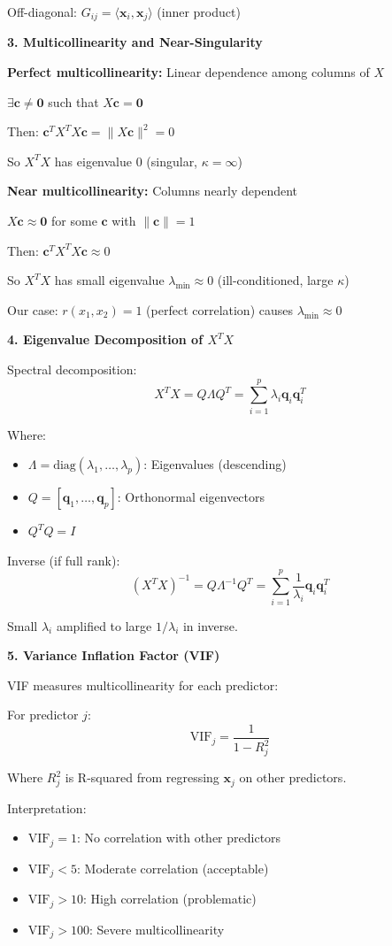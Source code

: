 \documentclass[12pt]{article}
\begin{document}
\begin{explanation}
Off-diagonal: $G_{ij} = \langle \mathbf{x}_i, \mathbf{x}_j \rangle$ (inner product)

\textbf{3. Multicollinearity and Near-Singularity}

\textbf{Perfect multicollinearity:} Linear dependence among columns of $X$

$\exists \mathbf{c} \neq \mathbf{0}$ such that $X\mathbf{c} = \mathbf{0}$

Then: $\mathbf{c}^T X^TX \mathbf{c} = \|X\mathbf{c}\|^2 = 0$

So $X^TX$ has eigenvalue 0 (singular, $\kappa = \infty$)

\textbf{Near multicollinearity:} Columns nearly dependent

$X\mathbf{c} \approx \mathbf{0}$ for some $\mathbf{c}$ with $\|\mathbf{c}\| = 1$

Then: $\mathbf{c}^T X^TX \mathbf{c} \approx 0$

So $X^TX$ has small eigenvalue $\lambda_{\min} \approx 0$ (ill-conditioned, large $\kappa$)

Our case: $r(x_1, x_2) = 1$ (perfect correlation) causes $\lambda_{\min} \approx 0$

\textbf{4. Eigenvalue Decomposition of $X^TX$}

Spectral decomposition:
\[X^TX = Q\Lambda Q^T = \sum_{i=1}^{p} \lambda_i \mathbf{q}_i \mathbf{q}_i^T\]

Where:
\begin{itemize}
\item $\Lambda = \text{diag}(\lambda_1, \ldots, \lambda_p)$: Eigenvalues (descending)
\item $Q = [\mathbf{q}_1, \ldots, \mathbf{q}_p]$: Orthonormal eigenvectors
\item $Q^TQ = I$
\end{itemize}

Inverse (if full rank):
\[(X^TX)^{-1} = Q\Lambda^{-1}Q^T = \sum_{i=1}^{p} \frac{1}{\lambda_i} \mathbf{q}_i \mathbf{q}_i^T\]

Small $\lambda_i$ amplified to large $1/\lambda_i$ in inverse.

\textbf{5. Variance Inflation Factor (VIF)}

VIF measures multicollinearity for each predictor:

For predictor $j$:
\[\text{VIF}_j = \frac{1}{1 - R_j^2}\]

Where $R_j^2$ is R-squared from regressing $\mathbf{x}_j$ on other predictors.

Interpretation:
\begin{itemize}
\item $\text{VIF}_j = 1$: No correlation with other predictors
\item $\text{VIF}_j < 5$: Moderate correlation (acceptable)
\item $\text{VIF}_j > 10$: High correlation (problematic)
\item $\text{VIF}_j > 100$: Severe multicollinearity
\end{itemize}


\end{explanation}
\end{document}
